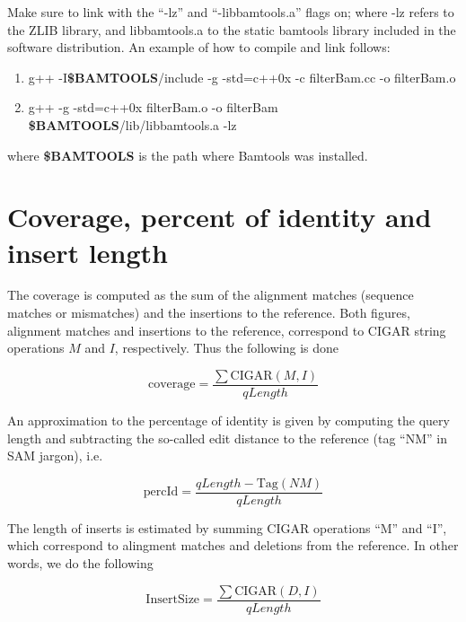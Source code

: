 \documentclass[11pt]{article}
\begin{document}
{Make sure to link with the ``-lz'' and ``-libbamtools.a'' flags on; where -lz refers to the ZLIB library, 
and libbamtools.a to the static bamtools library included in the software distribution. An example of 
how to compile and link follows: 

\begin{flushleft}
\begin{enumerate}
	\item	
		g++ -I\textbf{\$BAMTOOLS}/include   -g   -std=c++0x  -c filterBam.cc -o filterBam.o \\
	\item	g++     -g -std=c++0x  filterBam.o -o filterBam \textbf{\$BAMTOOLS}/lib/libbamtools.a -lz  
\end{enumerate}
\end{flushleft}
\vphantom{Nothing}
where \textbf{\$BAMTOOLS} is the path where Bamtools was installed.


\section{Coverage, percent of identity and insert length}
The coverage is computed as the sum of the alignment matches (sequence matches or mismatches) and 
the insertions to the reference. Both figures, alignment matches and insertions to the reference, correspond 
to CIGAR string operations $M$ and $I$, respectively. Thus the following is done 

\begin{equation}
	\mathrm{coverage} = \frac{\sum\mathrm{CIGAR}\left(M,I\right)}{qLength}
	\label{eq:coverage}
\end{equation}

An approximation to the percentage of identity is given by computing the query length and subtracting the 
so-called edit distance to the reference (tag ``NM'' in SAM jargon), i.e.

\begin{equation}
	\mathrm{percId} = \frac{qLength - \mathrm{Tag}(NM)}{qLength}
	\label{eq:percId}
\end{equation}

The length of inserts is estimated by summing CIGAR operations ``M'' and ``I'', which correspond to alingment 
matches and deletions from the reference. In other words, we do the following

\begin{equation}
	\mathrm{InsertSize} = \frac{\sum\mathrm{CIGAR}\left(D,I\right)}{qLength}
	\label{eq:baseInsert}
\end{equation}


}
\end{document}
